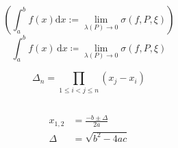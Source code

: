 \documentclass{ctexart}
\begin{document}
\begin{equation}
	
\end{equation}

\begin{equation}
		
\end{equation}

\begin{equation}
	
\end{equation}

\begin{equation}
	\left( \int_a^bf(x)\mathrm{d}x:=\lim_{\lambda(P)\rightarrow 0}\sigma(f, P, \xi) \right)
\end{equation}
\begin{equation}
\int_a^b f(x) \,\mathrm{d}x \coloneqq \lim_{\lambda(P)\rightarrow 0}\sigma(f, P, \xi)
\end{equation}

\begin{equation}
	\Delta_{n} = \prod_{1 \leqslant i < j \leqslant n} \left( x_{j} - x_{i} \right)	
\end{equation}

\begin{equation}
		
\end{equation}

\begin{equation}
	\begin{aligned}
		x_{1,2}&=\frac{-b\pm\Delta}{2a}\\
		\Delta&=\sqrt{b^2-4ac}
	\end{aligned}
\end{equation}






\end{document}
